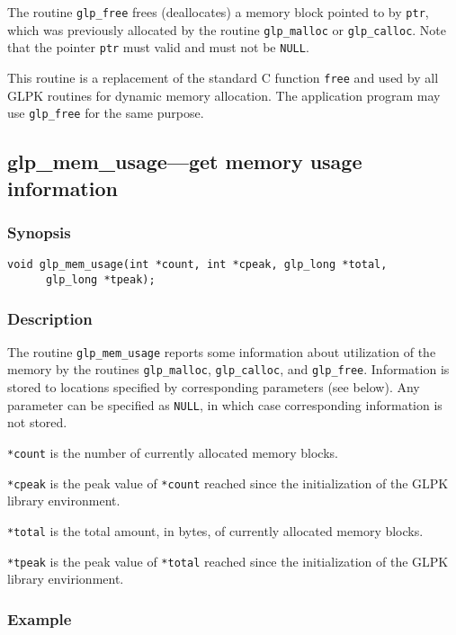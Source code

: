 The routine \verb|glp_free| frees (deallocates) a memory block pointed
to by \verb|ptr|, which was previously allocated by the routine
\verb|glp_malloc| or \verb|glp_calloc|. Note that the pointer \verb|ptr|
must valid and must not be \verb|NULL|.

This routine is a replacement of the standard C function \verb|free|
and used by all GLPK routines for dynamic memory allocation. The
application program may use \verb|glp_free| for the same purpose.

\subsection{glp\_mem\_usage---get memory usage information}

\subsubsection*{Synopsis}

\begin{verbatim}
void glp_mem_usage(int *count, int *cpeak, glp_long *total,
      glp_long *tpeak);
\end{verbatim}

\subsubsection*{Description}

The routine \verb|glp_mem_usage| reports some information about
utilization of the memory by the routines \verb|glp_malloc|,
\verb|glp_calloc|, and \verb|glp_free|. Information is stored to
locations specified by corresponding parameters (see below). Any
parameter can be specified as \verb|NULL|, in which case corresponding
information is not stored.

\verb|*count| is the number of currently allocated memory blocks.

\verb|*cpeak| is the peak value of \verb|*count| reached since the
initialization of the GLPK library environment.

\verb|*total| is the total amount, in bytes, of currently allocated
memory blocks.

\verb|*tpeak| is the peak value of \verb|*total| reached since the
initialization of the GLPK library envirionment.

\subsubsection*{Example}

